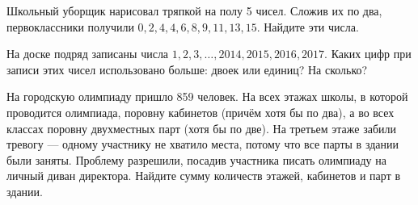 ﻿
\begin{enumerate}

\itA Школьный уборщик нарисовал тряпкой на полу 5 чисел. Сложив их по два, первоклассники получили $0, 2, 4, 4, 6, 8, 9, 11, 13, 15$. Найдите эти числа.

\itB На доске подряд записаны числа $1,2,3,\dots, 2014, 2015, 2016, 2017.$ Каких цифр при записи этих чисел использовано больше: двоек или единиц? На сколько?

\itC На городскую олимпиаду пришло 859 человек. На всех этажах школы, в которой проводится олимпиада, поровну кабинетов (причём хотя бы по два), а во всех классах поровну двухместных парт (хотя бы по две). На третьем этаже забили тревогу — одному участнику не хватило места, потому что все парты в здании были заняты. Проблему разрешили, посадив участника писать олимпиаду на личный диван директора. Найдите сумму количеств этажей, кабинетов и парт в здании.
\end{enumerate}